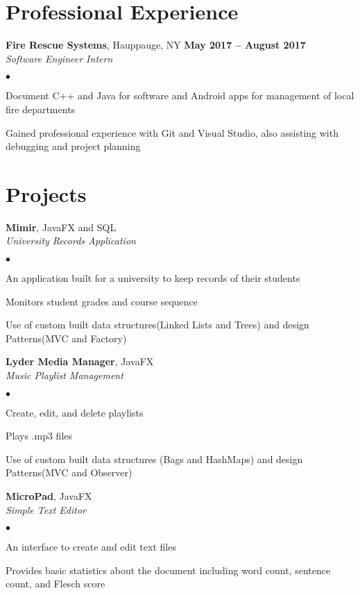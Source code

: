 \documentclass[margin,line]{res}
\newenvironment{list2}{
  \begin{list}{$\bullet$}{
      \setlength{\itemsep}{0in}
      \setlength{\parsep}{0in} \setlength{\parskip}{0in}
      \setlength{\topsep}{0in} \setlength{\partopsep}{0in}
      \setlength{\leftmargin}{0.2in}}}{\end{list}}
\begin{document}
\begin{resume}
\section{\sc Professional Experience}
{\bf Fire Rescue Systems}, Hauppauge, NY \hfill {\bf May 2017 -- August 2017}\\
{\em Software Engineer Intern}
\begin{list2} %
\item Document C++ and Java for software and Android apps for management of local fire departments
\item Gained professional experience with Git and Visual Studio, also assisting with debugging and project planning
\end{list2}

\section{\sc Projects}
{\bf Mimir}, JavaFX and SQL\\
{\em University Records Application}
\begin{list2}
\item An application built for a university to keep records of their students
\item Monitors student grades and course sequence
\item Use of custom built data structures(Linked Lists and Trees) and design Patterns(MVC and Factory)
\end{list2}
{\bf Lyder Media Manager}, JavaFX\\
{\em Music Playlist Management}
\begin{list2}
\item Create, edit, and delete playlists
\item Plays .mp3 files
\item Use of custom built data structures (Bags and HashMaps) and design Patterns(MVC and Observer)
\end{list2}
{\bf MicroPad}, JavaFX\\
{\em Simple Text Editor}
\begin{list2}
\item An interface to create and edit text files
\item Provides basic statistics about the document including word count, sentence count, and Flesch score
\end{list2}

\end{resume}
\end{document}
